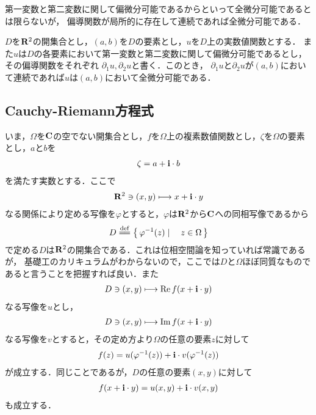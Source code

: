 	第一変数と第二変数に関して偏微分可能であるからといって全微分可能であるとは限らないが，
	偏導関数が局所的に存在して連続であれば全微分可能である．
	
	\begin{screen}
		\begin{thm}[偏導関数が連続であれば全微分可能]
		\label{thm:continuously_partially_differentiable_then_totally_differentiable}
			$D$を$\mathbf{R}^2$の開集合とし，$(a,b)$を$D$の要素とし，$u$を$D$上の実数値関数とする．
			また$u$は$D$の各要素において第一変数と第二変数に関して偏微分可能であるとし，その偏導関数をそれぞれ
			$\partial_1 u,\partial_2 u$と書く．このとき，
			$\partial_1 u$と$\partial_2 u$が$(a,b)$において連続であれば$u$は$(a,b)$において全微分可能である．
		\end{thm}
	\end{screen}
	
	\begin{sketch}
	\end{sketch}
	
\subsection{Cauchy-Riemann方程式}
	
	いま，$\Omega$を$\mathbf{C}$の空でない開集合とし，$f$を$\Omega$上の複素数値関数とし，$\zeta$を$\Omega$の要素とし，$a$と$b$を
	\begin{align}
		\zeta = a + \mathbf{i} \cdot b
	\end{align}
	を満たす実数とする．ここで
	\begin{align}
		\mathbf{R}^2 \ni (x,y) \longmapsto x + \mathbf{i} \cdot y
	\end{align}
	なる関係により定める写像を$\varphi$とすると，$\varphi$は$\mathbf{R}^2$から$\mathbf{C}$への同相写像であるから
	\begin{align}
		D \defeq \Set{\varphi^{-1}(z)}{z \in \Omega}
	\end{align}
	で定める$D$は$\mathbf{R}^2$の開集合である．これは位相空間論を知っていれば常識であるが，
	基礎工のカリキュラムがわからないので，ここでは$D$と$\Omega$ほぼ同質なものであると言うことを把握すれば良い．また
	\begin{align}
		D \ni (x,y) \longmapsto \operatorname{Re} f(x + \mathbf{i} \cdot y)
	\end{align}
	なる写像を$u$とし，
	\begin{align}
		D \ni (x,y) \longmapsto \operatorname{Im} f(x + \mathbf{i} \cdot y)
	\end{align}
	なる写像を$v$とすると，その定め方より$\Omega$の任意の要素$z$に対して
	\begin{align}
		f(z) = u(\varphi^{-1}(z)) + \mathbf{i} \cdot v(\varphi^{-1}(z))
	\end{align}
	が成立する．同じことであるが，$D$の任意の要素$(x,y)$に対して
	\begin{align}
		f(x + \mathbf{i} \cdot y) = u(x,y) + \mathbf{i} \cdot v(x,y)
	\end{align}
	も成立する．
	
